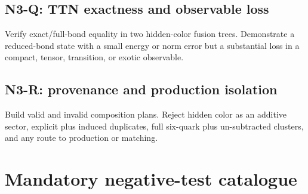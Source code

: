 \documentclass[11pt]{article}
\begin{document}
\subsection*{N3-Q: TTN exactness and observable loss}
Verify exact/full-bond equality in two hidden-color fusion trees.  Demonstrate a reduced-bond state with a small energy or norm error but a substantial loss in a compact, tensor, transition, or exotic observable.

\subsection*{N3-R: provenance and production isolation}
Build valid and invalid composition plans.  Reject hidden color as an additive sector, explicit plus induced duplicates, full six-quark plus un-subtracted clusters, and any route to production or matching.

\section{Mandatory negative-test catalogue}
\label{sec:negative-tests}
\end{document}
